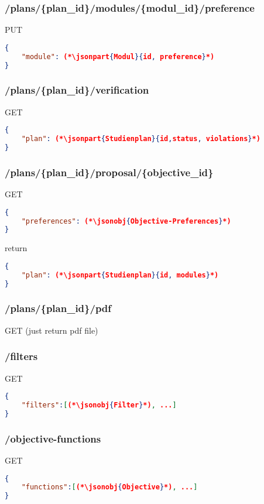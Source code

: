 \subsubsection{/plans/\{plan\_id\}/modules/\{modul\_id\}/preference}
PUT
\begin{lstlisting}[language=json,firstnumber=1]
{
	"module": (*\jsonpart{Modul}{id, preference}*)
}
\end{lstlisting}

\subsubsection{/plans/\{plan\_id\}/verification}
GET
\begin{lstlisting}[language=json,firstnumber=1]
{
	"plan": (*\jsonpart{Studienplan}{id,status, violations}*)
}
\end{lstlisting}

\subsubsection{/plans/\{plan\_id\}/proposal/\{objective\_id\}}
GET
\begin{lstlisting}[language=json,firstnumber=1]
{
	"preferences": (*\jsonobj{Objective-Preferences}*)
}
\end{lstlisting}
return
\begin{lstlisting}[language=json,firstnumber=1]
{
	"plan": (*\jsonpart{Studienplan}{id, modules}*)
}
\end{lstlisting}

\subsubsection{/plans/\{plan\_id\}/pdf}
GET (just return pdf file)

\subsubsection{/filters}
GET
\begin{lstlisting}[language=json,firstnumber=1]
{
	"filters":[(*\jsonobj{Filter}*), ...]
}
\end{lstlisting}

\subsubsection{/objective-functions}
GET
\begin{lstlisting}[language=json,firstnumber=1]
{
	"functions":[(*\jsonobj{Objective}*), ...]
}
\end{lstlisting}
